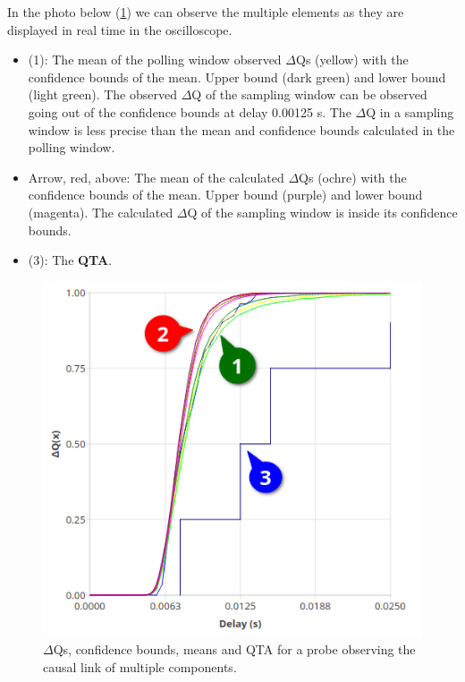     In the photo below (\cref{fig:dq_displ}) we can observe the multiple elements as they are displayed in real time in the oscilloscope.
    \begin{itemize}
        \item (1): The mean of the polling window observed $\Delta$Qs (yellow) with the confidence bounds of the mean. Upper bound (dark green) and lower bound (light green). The observed $\Delta$Q of the sampling window can be observed going out of the confidence bounds at delay 0.00125 s. The $\Delta$Q in a sampling window is less precise than the mean and confidence bounds calculated in the polling window.
        \item Arrow, red, above: The mean of the calculated $\Delta$Qs (ochre) with the confidence bounds of the mean. Upper bound (purple) and lower bound (magenta). The calculated $\Delta$Q of the sampling window is inside its confidence bounds.
        \item (3): The \textbf{QTA}.
    \end{itemize}
     \begin{figure}[H]
        \begin{center}
            \includegraphics[scale = 0.7]{img/overload_2/fired_sampleb.png}
        \end{center}
         \caption{$\Delta$Qs, confidence bounds, means and QTA for a probe observing the causal link of multiple components.}
         \label{fig:dq_displ}
    \end{figure}
        


